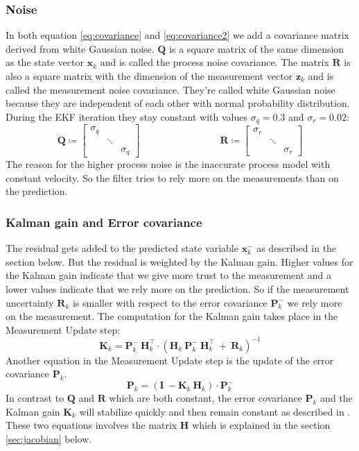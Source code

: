 \subsubsection{Noise}
In both equation \ref{eq:covariance} and \ref{eq:covariance2} we add a covariance matrix derived from white Gaussian noise. $\mathbf{Q}$ is a square matrix of the same dimension as the state vector $\mathbf{x}_k$ and is called the process noise covariance. The matrix $\mathbf{R}$ is also a square matrix with the dimension of the measurement vector $\mathbf{z}_k$ and is called the measurement noise covariance. They're called white Gaussian noise because they are independent of each other with normal probability distribution. During the EKF iteration they stay constant with values $\sigma_q = 0.3$ and $\sigma_r = 0.02$:
\begin{equation}
	\mathbf{Q} \coloneqq 
	\begin{bmatrix}
	\sigma_q & & \\
	& \ddots & \\
	& & \sigma_q
	\end{bmatrix}
\ \qquad \qquad \qquad \qquad 
\mathbf{R} \coloneqq 
\begin{bmatrix}
\sigma_r & & \\
& \ddots & \\
& & \sigma_r
\end{bmatrix}
\end{equation}
The reason for the higher process noise is the inaccurate process model with constant velocity. So the filter tries to rely more on the measurements than on the prediction.


\subsubsection{Kalman gain and Error covariance}
The residual gets added to the predicted state variable $\mathbf{x}_k^-$ as described in the section below. But the residual is weighted by the Kalman gain. Higher values for the Kalman gain indicate that we give more trust to the measurement and a lower values indicate that we rely more on the prediction. So if the measurement uncertainty $\mathbf{R}_k$ is smaller with respect to the error covariance $\mathbf{P}_k^-$ we rely more on the measurement. The computation for the Kalman gain takes place in the Measurement Update step: 
\begin{equation}
\mathbf{K}_k = \mathbf{P}_k^-\ \mathbf{H}_k^\intercal\cdot (\mathbf{H}_k\ \mathbf{P}_k^-\ \mathbf{H}_k^\intercal \ + \ \mathbf{R}_k)^{-1}
\end{equation}
Another equation in the Measurement Update step is the update of the error covariance $\mathbf{P}_k$. 
\begin{equation}\label{eq:covariance2}
\mathbf{P}_k = (\mathbf{I} \ - \mathbf{K}_k\ \mathbf{H}_k)\cdot \mathbf{P}_k^-
\end{equation}
In contrast to $\mathbf{Q}$ and $\mathbf{R}$ which are both constant, the error covariance $\mathbf{P}_k$ and the Kalman gain $\mathbf{K}_k$ will stabilize quickly and then remain constant as described in \cite{kalmanbook}.
These two equations involves the matrix $\mathbf{H}$ which is explained in the section \ref{sec:jacobian} below.

